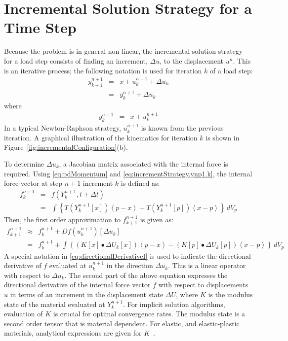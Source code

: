\documentclass[pdf,ps2pdf,12pt]{SANDreport}
\begin{document}
\section{Incremental Solution Strategy for a Time Step}
Because the problem is in general non-linear, the incremental solution strategy for a load step consists of finding an increment, $\Delta u$, to the displacement ${u}^{n}$.  This is an iterative process; the following notation is used for iteration $k$ of a load step:
\begin{eqnarray}
{y}^{n+1}_{k+1}&=&x + {u}^{n+1}_{k} +\Delta u_k  \nonumber \\
                               &=&{y}^{n+1}_{k}+\Delta u_k\label{eq:incrementStrategy}            
\end{eqnarray}
where 
\begin{eqnarray}
{y}^{n+1}_{k}&=& x+{u}^{n+1}_{k}  \label{eq:incrementStrategy.ynp1.k}
\end{eqnarray}
In a typical Newton-Raphson strategy, ${u}^{n+1}_{k}$ is known from the previous iteration.  A graphical illustration of the kinematics for iteration $k$ is shown in Figure~\ref{fig:incrementalConfiguration}(b).   

To determine $\Delta u_k$, a Jacobian matrix associated with the internal force is required.  Using \eqref{eq:pdMomentum} and \eqref{eq:incrementStrategy.ynp1.k}, the internal force vector at step $n+1$ increment $k$ is defined as:
\begin{eqnarray}
{f}^{n+1}_{k}&=&f({Y}^{n+1}_{k},t+\Delta t)  \nonumber \\
                          &=& \int\left\lbrace T({Y}^{n+1}_{k}[x])\left\langle p-x \right\rangle  - T({Y}^{n+1}_{k}[p]) \left\langle x-p \right\rangle \right\rbrace \,dV_p\label{eq:pdIncrementalInternalForce}
\end{eqnarray}
Then, the first order approximation to $f^{n+1}_{k+1}$ is given as:
\begin{eqnarray}
{f}^{n+1}_{k+1}&\approx& {f}^{n+1}_{k}+Df(u^{n+1}_k)[\Delta u_k] \label{eq:directionalDerivativeI} \\     
                              &=& {f}^{n+1}_{k}+\int\left\lbrace (K[x]\bullet \Delta U_k[x])\left\langle p-x \right\rangle  - (K[p]\bullet \Delta U_k[p]) \left\langle x-p \right\rangle \right\rbrace \,dV_p \nonumber 
\end{eqnarray}
A special notation in \eqref{eq:directionalDerivativeI} is used to indicate the directional derivative of $f$ evaluated at $u^{n+1}_k$ in the direction $\Delta u_k$.  This is a linear operator with respect to $\Delta u_k$.
The second part of the above equation expresses the directional derivative of the internal force vector $f$ with respect to displacements $u$ in terms of an increment in the displacement state $ \Delta U$, where $K$ is the modulus state \cite{ref:pdStates.Silling} of the material evaluated at ${Y}^{n+1}_{k}$.  For implicit solution algorithms, evaluation of $K$ is crucial for optimal convergence rates.  The modulus state is a second order tensor that is material dependent.   For elastic, and elastic-plastic materials, analytical expressions are given for $K$~\cite{ref:statePlasticityMitchell}. 
\end{document}
